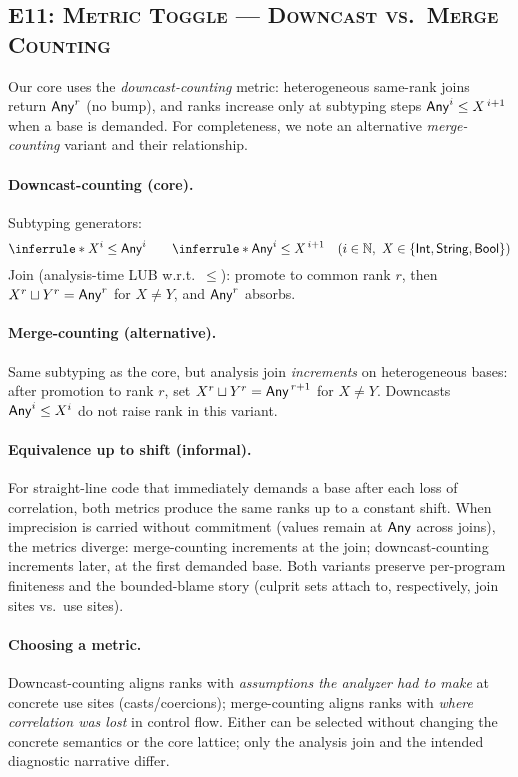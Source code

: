 \subsection{\textsc{E11: Metric Toggle — Downcast vs.\ Merge Counting}}

Our core uses the \emph{downcast-counting} metric:
heterogeneous same-rank joins return \(\mathsf{Any}^{r}\) (no bump), and ranks increase only at subtyping steps \(\mathsf{Any}^{i}\le X^{\,i+1}\) when a base is demanded.
For completeness, we note an alternative \emph{merge-counting} variant and their relationship.

\paragraph{Downcast-counting (core).}
Subtyping generators:
\[
\inferrule*{ }{X^{i}\le \Any^{i}}
\qquad
\inferrule*{ }{\Any^{i}\le X^{\,i+1}}
\quad(i\in\mathbb{N},\ X\in\{\Int,\String,\Bool\})
\]
Join (analysis-time LUB w.r.t.\ \(\le\)): promote to common rank \(r\), then
\(X^{r}\sqcup Y^{r}=\mathsf{Any}^{r}\) for \(X\neq Y\), and \(\mathsf{Any}^{r}\) absorbs.

\paragraph{Merge-counting (alternative).}
Same subtyping as the core, but analysis join \emph{increments} on heterogeneous bases:
after promotion to rank \(r\), set \(X^{r}\sqcup Y^{r}=\mathsf{Any}^{\,r+1}\) for \(X\neq Y\).
Downcasts \(\mathsf{Any}^{i}\le X^{i}\) do not raise rank in this variant.

\paragraph{Equivalence up to shift (informal).}
For straight-line code that immediately demands a base after each loss of correlation, both metrics produce the same ranks up to a constant shift.
When imprecision is carried without commitment (values remain at \(\mathsf{Any}\) across joins), the metrics diverge:
merge-counting increments at the join; downcast-counting increments later, at the first demanded base.
Both variants preserve per-program finiteness and the bounded-blame story (culprit sets attach to, respectively, join sites vs.\ use sites).

\paragraph{Choosing a metric.}
Downcast-counting aligns ranks with \emph{assumptions the analyzer had to make} at concrete use sites (casts/coercions);
merge-counting aligns ranks with \emph{where correlation was lost} in control flow.
Either can be selected without changing the concrete semantics or the core lattice; only the analysis join and the intended diagnostic narrative differ.

